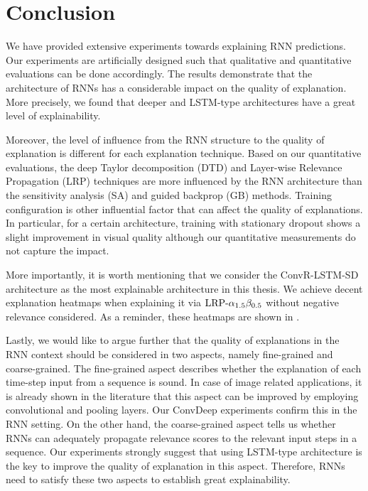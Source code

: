 \chapter{Conclusion}
\label{cha:chapter5}
We have provided extensive experiments towards explaining RNN predictions. Our experiments are artificially designed such that qualitative and quantitative evaluations can be done accordingly.  The results demonstrate that the architecture of RNNs has a considerable impact on the quality of explanation. More precisely, we found that deeper and LSTM-type architectures have a great level of explainability.

Moreover, the level of influence from the RNN structure to the quality of explanation is different for each explanation technique. Based on our quantitative evaluations, the deep Taylor decomposition (DTD) and Layer-wise Relevance Propagation (LRP) techniques are more influenced by the RNN architecture than the sensitivity analysis (SA) and guided backprop (GB) methods.  Training configuration is  other influential factor that can affect the quality of explanations. In particular, for a certain architecture, training with stationary dropout shows a slight improvement in visual quality although our quantitative measurements do not capture the impact.

More importantly, it is worth mentioning that we consider the ConvR-LSTM-SD architecture as the most explainable architecture in this thesis. We achieve decent explanation heatmaps when explaining it via $\text{LRP-}\alpha_{1.5}\beta_{0.5}$ without negative relevance considered. As a reminder, these heatmaps are shown in \addfigure{\ref{fig:heatmap_msc_convrlstm_pos_rel}}.

Lastly, we would like to argue further that the quality of explanations in the RNN context should be considered in two aspects, namely fine-grained and coarse-grained.  The fine-grained aspect describes whether the explanation of each time-step input from a sequence is sound. In case of image related applications, it is already shown in the literature that this aspect can be improved by employing convolutional and pooling layers. Our ConvDeep experiments confirm this in the RNN setting. On the other hand, the coarse-grained aspect tells us whether RNNs can adequately propagate relevance scores to the relevant input steps in a sequence. Our experiments strongly suggest that using LSTM-type architecture is the key to improve the quality of explanation in this aspect. Therefore, RNNs need to satisfy these two aspects to establish great explainability.



